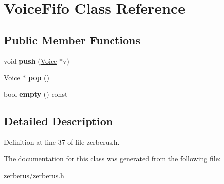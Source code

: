 \hypertarget{class_voice_fifo}{}\section{Voice\+Fifo Class Reference}
\label{class_voice_fifo}
\subsection*{Public Member Functions}
\begin{DoxyCompactItemize}
\item 
\mbox{\label{class_voice_fifo_aff441c271ead117e72c22955205a1082}} 
void {\bfseries push} (\hyperlink{class_voice}{Voice} $\ast$v)
\item 
\mbox{\label{class_voice_fifo_a1052cf994f9b313762126511941d6390}} 
\hyperlink{class_voice}{Voice} $\ast$ {\bfseries pop} ()
\item 
\mbox{\label{class_voice_fifo_aefa35221803186c676d4af8878ab8463}} 
bool {\bfseries empty} () const
\end{DoxyCompactItemize}


\subsection{Detailed Description}


Definition at line 37 of file zerberus.\+h.



The documentation for this class was generated from the following file\+:\begin{DoxyCompactItemize}
\item 
zerberus/zerberus.\+h\end{DoxyCompactItemize}
